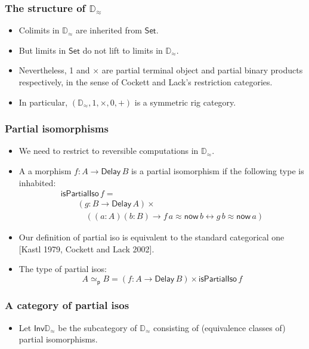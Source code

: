 \documentclass[12pt,t]{beamer}
\newcommand{\Set}{\mathsf{Set}}
\newcommand{\Inv}{\mathsf{Inv}}
\newcommand{\Delay}{\ensuremath{\mathsf{Delay}\,}}
\newcommand{\now}{\mathsf{now}}
\newcommand{\Dapprox}{\mathbb{D}_{\approx}}
\newcommand{\piso}{\mathsf{isPartialIso}}
\begin{document}
\begin{frame}

  \frametitle{The structure of $\Dapprox$}
  \begin{itemize}
  \item Colimits in $\Dapprox$ are inherited from $\Set$.
  \item But limits in $\Set$ do not lift to limits in $\Dapprox$.
    \pause
    \vspace{\fill}
  \item Nevertheless, 1 and $\times$ are partial terminal object and
    partial binary products respectively, in the sense of Cockett and
    Lack's restriction categories.
  \item In particular, $(\Dapprox,1,\times,0,+)$ is a symmetric rig
    category.
    
  \end{itemize}
  
  
\end{frame}

\begin{frame}

  \frametitle{Partial isomorphisms}
  
  \begin{itemize}
  \item We need to restrict to reversible computations in $\Dapprox$.
  \item A a morphism $f : A \to \Delay B$ is a partial isomorphism if
    the following type is inhabited:
    \[
    \begin{array}{l}
      \piso \,f = \\
      \qquad (g : B \to \Delay A) \times \\
      \qquad \quad \left( (a : A) (b : B) \to  f
      \,a \approx \now\,b \leftrightarrow g \,b \approx \now\,a  \right)  
    \end{array}
    \]
    \item Our definition of partial iso is equivalent to
the standard categorical one [Kastl 1979, Cockett and Lack 2002].
  \item The type of partial isos:
    \[
    A \simeq_{\mathsf{p}} B = (f : A \to \Delay B) \times \piso \,f
    \]
  \end{itemize}
  
  
\end{frame}

\begin{frame}

  \frametitle{A category of partial isos}
  \begin{itemize}
    \item Let $\Inv \Dapprox$ be the subcategory of $\Dapprox$
      consisting of (equivalence classes of) partial isomorphisms.
  \end{itemize}
  
  
\end{frame}
\end{document}
